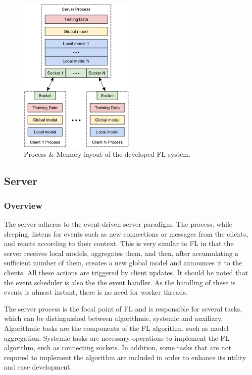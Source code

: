 \begin{figure}[H]
    \centering
        \includegraphics[width=0.5\textwidth]{Images/block_diagrams/memory_layout.png}
        \decoRule
        \caption[Process \& Memory layout]{Process \& Memory layout of the developed FL system.}
        \label{fig:process_mem_layout}
\end{figure}

\subsection{Server}
\label{sec:server}
\subsubsection{Overview}
The server adheres to the event-driven server paradigm. The process, while sleeping, listens for events such as new connections or messages from the clients, and reacts according to their context. This is very similar to FL in that the server receives local models, aggregates them, and then, after accumulating a sufficient number of them, creates a new global model and announces it to the clients. All these actions are triggered by client updates. It should be noted that the event scheduler is also the the event handler. As the handling of these is events is almost instant, there is no need for worker threads. 

The server process is the focal point of FL and is responsible for several tasks, which can be distinguished between algorithmic, systemic and auxiliary. Algorithmic tasks are the components of the FL algorithm, such as model aggregation. Systemic tasks are necessary operations to implement the FL algorithm, such as connecting sockets. In addition, some tasks that are not required to implement the algorithm are included in order to enhance its utility and ease development.

